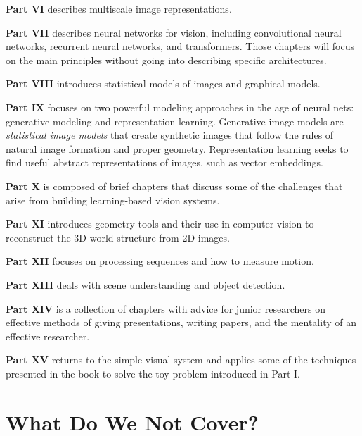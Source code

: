 {\bf Part VI} describes multiscale image representations. 

{\bf Part VII} describes neural networks for vision, including convolutional neural networks, recurrent neural networks, and transformers. Those chapters will focus on the main principles without going into describing specific architectures. 

{\bf Part VIII} introduces statistical models of images and graphical models. 

{\bf Part IX} focuses on two powerful modeling approaches in the age of neural nets: generative modeling and representation learning. Generative image models
are \textit{statistical image models} that create synthetic images that follow the rules of natural image formation and proper geometry. Representation learning seeks to find useful abstract representations of images, such as vector embeddings.

{\bf Part X} is composed of brief chapters that discuss some of the challenges that arise from building learning-based vision systems. 

{\bf Part XI} introduces geometry tools and their use in computer vision to reconstruct the 3D world structure from 2D images. 

{\bf Part XII} focuses on processing sequences and how to measure motion. 

{\bf Part XIII} deals with scene understanding and object detection. 

{\bf Part XIV} is a collection of chapters with advice for junior researchers on effective methods of giving presentations, writing papers, and the mentality of an effective researcher. 

{\bf Part XV} returns to the simple visual system and applies some of the techniques presented in the book to solve the toy problem introduced in Part I. 



\section*{What Do We Not Cover?}

